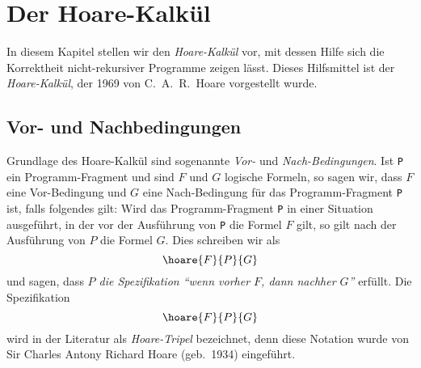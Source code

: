 \chapter{Der Hoare-Kalk\"ul} 
In diesem Kapitel stellen wir den \emph{Hoare-Kalk\"ul} vor, mit dessen Hilfe sich die
Korrektheit nicht-rekursiver Programme zeigen l\"asst.
Dieses Hilfsmittel ist der \emph{Hoare-Kalk\"ul}, der 1969 von C.~A.~R.~Hoare 
\cite{hoare:69} vorgestellt wurde.

\section{Vor- und Nachbedingungen}
Grundlage des Hoare-Kalk\"ul sind sogenannte \emph{Vor-} und \emph{Nach-Bedingungen}.  Ist
\texttt{P} ein Programm-Fragment und sind $F$ und $G$ logische Formeln, so sagen wir, dass
$F$ eine Vor-Bedingung und $G$ eine Nach-Bedingung f\"ur das Programm-Fragment \texttt{P}
ist, falls folgendes gilt: Wird das Programm-Fragment \texttt{P} in einer Situation
ausgef\"uhrt, in der vor der Ausf\"uhrung von \texttt{P} die Formel $F$ gilt, so gilt nach der
Ausf\"uhrung von $P$ die Formel $G$.  Dies schreiben wir als
\[ \hoare{F}{P}{G} \]
und sagen, dass \emph{$P$ die Spezifikation ``wenn vorher $F$, dann nachher $G$''} erf\"ullt.
Die Spezifikation 
\[ \hoare{F}{P}{G} \]
wird in der Literatur  als \emph{Hoare-Tripel} 
bezeichnet, denn diese Notation wurde von Sir Charles Antony Richard Hoare (geb.~1934) \cite{hoare:69}
eingef\"uhrt.
\vspace*{0.3cm}

